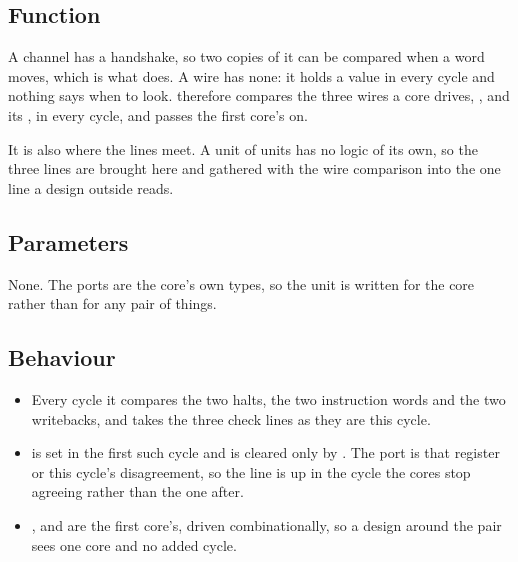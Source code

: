 
%
{}

\subsection*{Function}

A channel has a handshake, so two copies of it can be compared when a
word moves, which is what  does. A wire has none: it holds
a value in every cycle and nothing says when to look. 
therefore compares the three wires a  core drives,
,  and its , in every cycle, and
passes the first core's on.

It is also where the lines meet. A unit of units has no logic of its
own, so the three  lines are brought here and gathered with
the wire comparison into the one line a design outside reads.

\subsection*{Parameters}

None. The ports are the core's own types, so the unit is written for
the core rather than for any pair of things.


\subsection*{Behaviour}

\begin{itemize}
\item Every cycle it compares the two halts, the two instruction words
and the two writebacks, and takes the three check lines as they are
this cycle.
\item {} is set in the first such cycle and is cleared
only by . The  port is that register or this
cycle's disagreement, so the line is up in the cycle the cores stop
agreeing rather than the one after.
\item {},  and  are the first core's,
driven combinationally, so a design around the pair sees one core and
no added cycle.
\end{itemize}

